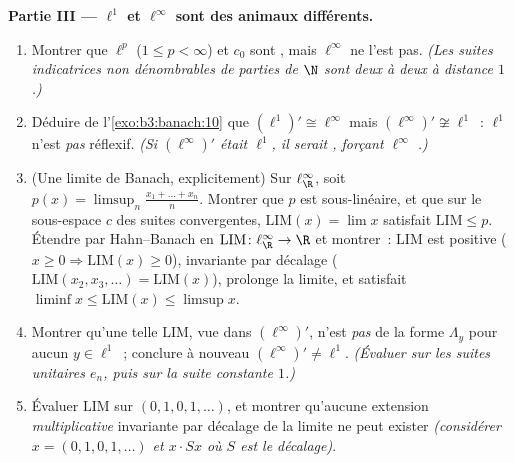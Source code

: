 \begin{problem}[{Problème de fin de semaine --- $(\ell^p)' =
\ell^q$, réflexivité, et l'étrangeté de $\ell^\infty$}]
\medskip
\noindent\textbf{Partie III --- $\ell^1$ et $\ell^\infty$ sont
des animaux différents.}
\begin{enumerate}[resume]
  \item Montrer que $\ell^p$ ($1 \leq p < \infty$) et $c_0$
        sont , mais $\ell^\infty$ ne l'est pas.
        \emph{(Les suites indicatrices non dénombrables de
        parties de $\N$ sont deux à deux à distance $1$.)}
  \item Déduire de l'\cref{exo:b3:banach:10} que $(\ell^1)'
        \cong \ell^\infty$ mais $(\ell^\infty)' \not\cong
        \ell^1$~: $\ell^1$ n'est \emph{pas} réflexif.
        \emph{(Si $(\ell^\infty)'$ était $\ell^1$, il serait
        , forçant $\ell^\infty$ .)}
  \item (Une limite de Banach, explicitement) Sur
        $\ell^\infty_\R$, soit $p(x) = \limsup_n \frac{x_1 +
        \dots + x_n}{n}$. Montrer que $p$ est sous-linéaire,
        et que sur le sous-espace $c$ des suites convergentes,
        $\mathrm{LIM}(x) = \lim x$ satisfait $\mathrm{LIM}
        \leq p$. Étendre par Hahn--Banach en $\mathrm{LIM}
        \colon \ell^\infty_\R \to \R$ et montrer~:
        $\mathrm{LIM}$ est positive ($x \geq 0 \Rightarrow
        \mathrm{LIM}(x) \geq 0$), invariante par décalage
        ($\mathrm{LIM}(x_2, x_3, \dots) = \mathrm{LIM}(x)$),
        prolonge la limite, et satisfait $\liminf x \leq
        \mathrm{LIM}(x)\leq \limsup x$.
  \item Montrer qu'une telle $\mathrm{LIM}$, vue dans
        $(\ell^\infty)'$, n'est \emph{pas} de la forme
        $\Lambda_y$ pour aucun $y \in \ell^1$~; conclure à
        nouveau $(\ell^\infty)' \neq \ell^1$.
        \emph{(Évaluer sur les suites unitaires $e_n$, puis
        sur la suite constante $1$.)}
  \item Évaluer $\mathrm{LIM}$ sur $(0,1,0,1,\dots)$, et
        montrer qu'aucune extension \emph{multiplicative}
        invariante par décalage de la limite ne peut exister
        \emph{(considérer $x = (0,1,0,1,\dots)$ et $x\cdot
        Sx$ où $S$ est le décalage)}.
\end{enumerate}


\end{problem}
